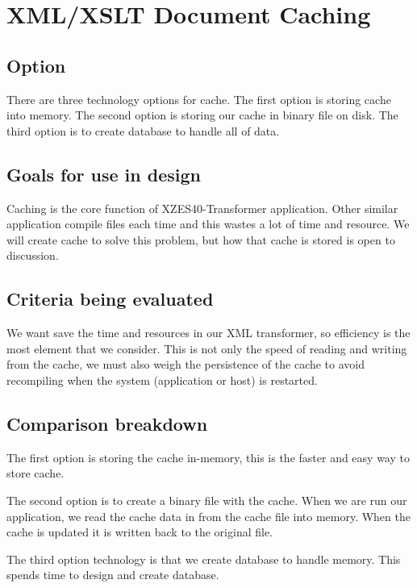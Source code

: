 \section{XML/XSLT Document Caching}

\subsection{Option}

There are three technology options for cache.
The first option is storing cache into memory.
The second option is storing our cache in binary file on disk.
The third option is to create database to handle all of data.

\subsection{Goals for use in design}

Caching is the core function of XZES40-Transformer application.
Other similar application compile files each time and this wastes a lot of time and resource.
We will create cache to solve this problem, but how that cache is stored is open to discussion.

\subsection{Criteria being evaluated}

We want save the time and resources in our XML transformer, so efficiency is the most element that we consider.
This is not only the speed of reading and writing from the cache, we must also weigh the persistence of the cache to avoid recompiling when the system (application or host) is restarted.

\subsection{Comparison breakdown}

The first option is storing the cache in-memory, this is the faster and easy way to store cache.

The second option is to create a binary file with the cache.
When we are run our application, we read the cache data in from the cache file into memory.
When the cache is updated it is written back to the original file.

The third option technology is that we create database to handle memory.
This spends time to design and create database.

